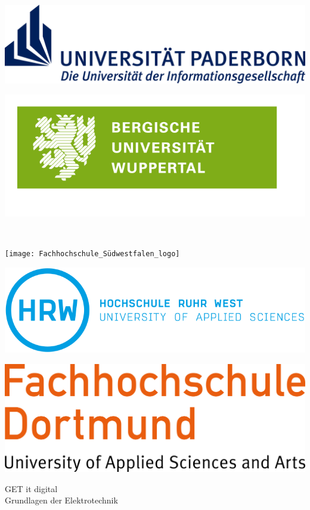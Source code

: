 \documentclass[twoside, a4paper]{article}
\begin{document}
\begin{center}
\begin{minipage}[c][2cm][c]{0.3\textwidth}
	\end{minipage}
	\hfill
	\begin{minipage}[c][2cm][c]{0.3\textwidth}
		\includegraphics[width=\linewidth]{Logo_Uni_Paderborn}
	\end{minipage}
	\hfill
	\begin{minipage}[c][2cm][c]{0.3\textwidth}
		\includegraphics[width=\linewidth]{BUW_Logo-weiss-auf-gruen-rgb}
	\end{minipage}
	\\
	\begin{minipage}[c][2cm][c]{0.3\textwidth}
		\texttt{[image: Fachhochschule\_Südwestfalen\_logo]}
	\end{minipage}
	\hfill
	\begin{minipage}[c][2cm][c]{0.3\textwidth}
		\includegraphics[width=\linewidth]{logo-hrw}
	\end{minipage}
	\hfill
	\begin{minipage}[c][2cm][c]{0.3\textwidth}
		\begin{center}
			\includegraphics[width=0.7\linewidth]{FH_Dortmund-logo}
		\end{center}
	\end{minipage}

	\vfill
	{\large GET it digital} \\[10ex]
	{\large Grundlagen der Elektrotechnik}\\[10ex]
	\ \\
\end{center}
\vfill
\end{document}
